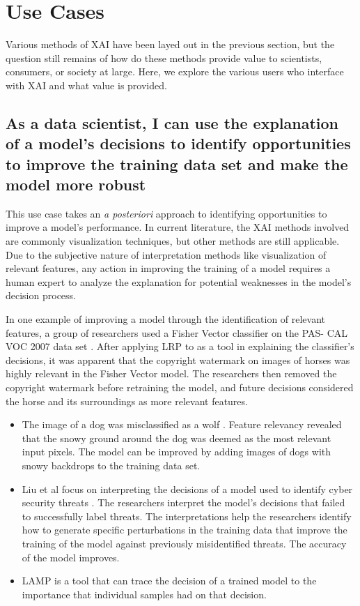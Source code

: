 \section{Use Cases} \label{sec:UseCases}
Various methods of XAI have been layed out in the previous section, but the question still remains of how do these methods provide value to scientists, consumers, or society at large.  Here, we explore the various users who interface with XAI and what value is provided.

\subsection{As a data scientist, I can use the explanation of a model's decisions to identify opportunities to improve the training data set and make the model more robust}

This use case takes an \textit{a posteriori} approach to identifying opportunities to improve a model's performance.  In current literature, the XAI methods involved are commonly visualization techniques, but other methods are still applicable.  Due to the subjective nature of interpretation methods like visualization of relevant features, any action in improving the training of a model requires a human expert to analyze the explanation for potential weaknesses in the model's decision process.

In one example of improving a model through the identification of relevant features, a group of researchers used a Fisher Vector classifier on the PAS- CAL VOC 2007 data set \cite{Bach2016AnalyzingCF}.  After applying LRP to as a tool in explaining the classifier's decisions, it was apparent that the copyright watermark on images of horses was highly relevant in the Fisher Vector model.  The researchers then removed the copyright watermark before retraining the model, and future decisions considered the horse and its surroundings as more relevant features.

\begin{itemize}
    \item The image of a dog was misclassified as a wolf \cite{Ribeiro:2016:WIT:2939672.2939778}.  Feature relevancy revealed that the snowy ground around the dog was deemed as the most relevant input pixels.  The model can be improved by adding images of dogs with snowy backdrops to the training data set.
    \item Liu et al focus on interpreting the decisions of a model used to identify cyber security threats \cite{Liu:2018:ADM:3219819.3220027}.  The researchers interpret the model's decisions that failed to successfully label threats.  The interpretations help the researchers identify how to generate specific perturbations in the training data that improve the training of the model against previously misidentified threats.  The accuracy of the model improves.
    \item LAMP is a tool that can trace the decision of a trained model to the importance that individual samples had on that decision. \cite{Ma2017}
\end{itemize}

